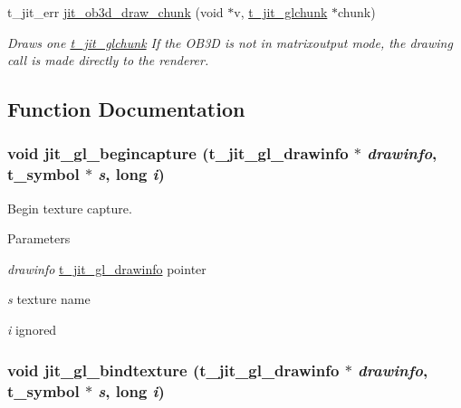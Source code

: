 \begin{DoxyCompactItemize}
t\_\-jit\_\-err \hyperlink{group__ob3dmod_gacb2a2ba1b2bb33377aa10b45bb3a0531}{jit\_\-ob3d\_\-draw\_\-chunk} (void $\ast$v, \hyperlink{structt__jit__glchunk}{t\_\-jit\_\-glchunk} $\ast$chunk)
\begin{DoxyCompactList}\small\item\em Draws one \hyperlink{structt__jit__glchunk}{t\_\-jit\_\-glchunk} If the OB3D is not in matrixoutput mode, the drawing call is made directly to the renderer. \item\end{DoxyCompactList}\end{DoxyCompactItemize}


\subsection{Function Documentation}
\hypertarget{group__ob3dmod_gafdefdd4ecd67b98eea24ede76032d4c4}{
\subsubsection[{jit\_\-gl\_\-begincapture}]{\setlength{\rightskip}{0pt plus 5cm}void jit\_\-gl\_\-begincapture ({\bf t\_\-jit\_\-gl\_\-drawinfo} $\ast$ {\em drawinfo}, \/  {\bf t\_\-symbol} $\ast$ {\em s}, \/  long {\em i})}}
\label{group__ob3dmod_gafdefdd4ecd67b98eea24ede76032d4c4}


Begin texture capture. 
\begin{DoxyParams}{Parameters}
\item[{\em drawinfo}]\hyperlink{structt__jit__gl__drawinfo}{t\_\-jit\_\-gl\_\-drawinfo} pointer \item[{\em s}]texture name \item[{\em i}]ignored \end{DoxyParams}
\hypertarget{group__ob3dmod_ga2b791de45bbe16269fd787ab774348d7}{
\subsubsection[{jit\_\-gl\_\-bindtexture}]{\setlength{\rightskip}{0pt plus 5cm}void jit\_\-gl\_\-bindtexture ({\bf t\_\-jit\_\-gl\_\-drawinfo} $\ast$ {\em drawinfo}, \/  {\bf t\_\-symbol} $\ast$ {\em s}, \/  long {\em i})}}
\label{group__ob3dmod_ga2b791de45bbe16269fd787ab774348d7}


